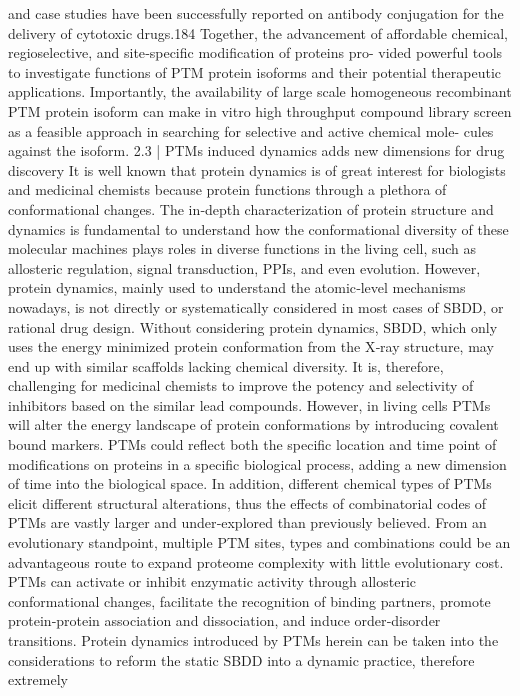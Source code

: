 and case studies have been successfully reported on antibody conjugation for the delivery of cytotoxic drugs.184
Together, the advancement of affordable chemical, regioselective, and site‐specific modification of proteins pro-
vided powerful tools to investigate functions of PTM protein isoforms and their potential therapeutic applications.
Importantly, the availability of large scale homogeneous recombinant PTM protein isoform can make in vitro high
throughput compound library screen as a feasible approach in searching for selective and active chemical mole-
cules against the isoform.
2.3
|
PTMs induced dynamics adds new dimensions for drug discovery
It is well known that protein dynamics is of great interest for biologists and medicinal chemists because protein
functions through a plethora of conformational changes. The in‐depth characterization of protein structure and
dynamics is fundamental to understand how the conformational diversity of these molecular machines plays roles
in diverse functions in the living cell, such as allosteric regulation, signal transduction, PPIs, and even evolution.
However, protein dynamics, mainly used to understand the atomic‐level mechanisms nowadays, is not directly or
systematically considered in most cases of SBDD, or rational drug design. Without considering protein dynamics,
SBDD, which only uses the energy minimized protein conformation from the X‐ray structure, may end up with
similar scaffolds lacking chemical diversity. It is, therefore, challenging for medicinal chemists to improve the
potency and selectivity of inhibitors based on the similar lead compounds. However, in living cells PTMs will alter
the energy landscape of protein conformations by introducing covalent bound markers. PTMs could reflect both
the specific location and time point of modifications on proteins in a specific biological process, adding a new
dimension of time into the biological space. In addition, different chemical types of PTMs elicit different structural
alterations, thus the effects of combinatorial codes of PTMs are vastly larger and under‐explored than previously
believed. From an evolutionary standpoint, multiple PTM sites, types and combinations could be an advantageous
route to expand proteome complexity with little evolutionary cost. PTMs can activate or inhibit enzymatic activity
through allosteric conformational changes, facilitate the recognition of binding partners, promote protein‐protein
association and dissociation, and induce order‐disorder transitions. Protein dynamics introduced by PTMs herein
can be taken into the considerations to reform the static SBDD into a dynamic practice, therefore extremely
